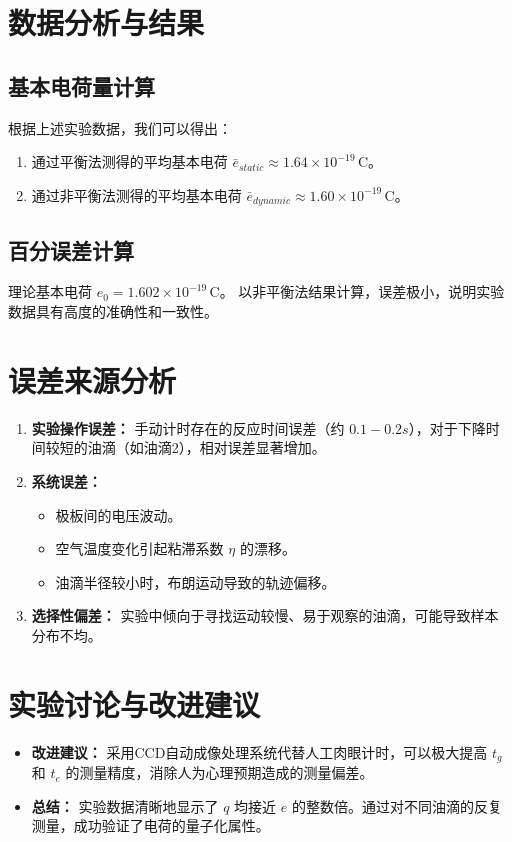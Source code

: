 \documentclass[12pt,a4paper]{article}
\begin{document}
	\section{数据分析与结果}
	\subsection{基本电荷量计算}
	根据上述实验数据，我们可以得出：
	\begin{enumerate}
		\item 通过平衡法测得的平均基本电荷 $\bar{e}_{static} \approx 1.64 \times 10^{-19}\,\text{C}$。
		\item 通过非平衡法测得的平均基本电荷 $\bar{e}_{dynamic} \approx 1.60 \times 10^{-19}\,\text{C}$。
	\end{enumerate}
	
	\subsection{百分误差计算}
	理论基本电荷 $e_0 = 1.602 \times 10^{-19}\,\text{C}$。
	以非平衡法结果计算，误差极小，说明实验数据具有高度的准确性和一致性。
	
	\section{误差来源分析}
	\begin{enumerate}
		\item \textbf{实验操作误差：} 手动计时存在的反应时间误差（约 $0.1-0.2s$），对于下降时间较短的油滴（如油滴2），相对误差显著增加。
		\item \textbf{系统误差：} 
		\begin{itemize}
			\item 极板间的电压波动。
			\item 空气温度变化引起粘滞系数 $\eta$ 的漂移。
			\item 油滴半径较小时，布朗运动导致的轨迹偏移。
		\end{itemize}
		\item \textbf{选择性偏差：} 实验中倾向于寻找运动较慢、易于观察的油滴，可能导致样本分布不均。
	\end{enumerate}
	
	\section{实验讨论与改进建议}
	\begin{itemize}
		\item \textbf{改进建议：} 采用CCD自动成像处理系统代替人工肉眼计时，可以极大提高 $t_g$ 和 $t_e$ 的测量精度，消除人为心理预期造成的测量偏差。
		\item \textbf{总结：} 实验数据清晰地显示了 $q$ 均接近 $e$ 的整数倍。通过对不同油滴的反复测量，成功验证了电荷的量子化属性。
	\end{itemize}
	
\end{document}
